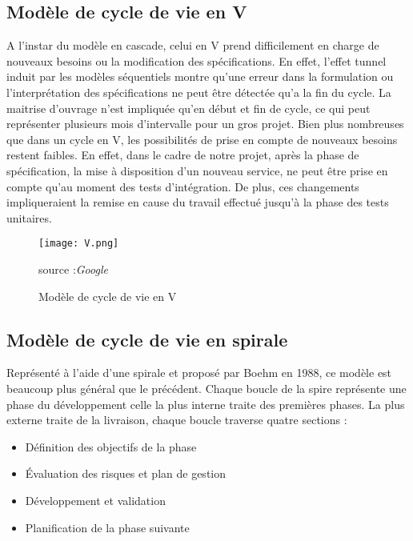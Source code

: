 {{\subsection{Modèle de cycle de vie en V\cite{Ref13}}

A l’instar du modèle en cascade, celui en V prend difficilement en charge de nouveaux besoins ou la modification des spécifications. En effet, l’effet tunnel induit par les modèles séquentiels montre qu’une erreur dans la formulation ou l’interprétation des spécifications ne peut être détectée qu’a la fin du cycle. La maitrise d’ouvrage n’est impliquée qu’en début et fin de cycle, ce qui peut représenter plusieurs mois d’intervalle pour un gros projet. Bien plus nombreuses que dans un cycle en V, les possibilités de prise en compte de nouveaux besoins restent faibles. En effet, dans le cadre de notre projet, après la phase de spécification, la mise à disposition d’un nouveau service, ne peut être prise en compte qu’au moment des tests d’intégration. De plus, ces changements impliqueraient la remise en cause du travail effectué jusqu’à la phase des tests unitaires.

\begin{figure}[H]
	\centering
	\texttt{[image: V.png]}
	\caption{Modèle de cycle de vie en V}{ \begin{center} source :\textit{Google} \end{center}}
	\label{fig:V}
\end{figure}

\subsection{Modèle de cycle de vie en spirale \cite{Ref13}}

Représenté à l’aide d’une spirale et proposé par Boehm en 1988, ce modèle est beaucoup plus général que le précédent. Chaque boucle de la spire représente une phase du développement celle la plus interne traite des premières phases. La plus externe traite de la livraison, chaque boucle traverse quatre sections :

	\begin{itemize}[label=\textbullet, font=\LARGE \color{blue}] 
		
		\item Définition des objectifs de la phase 
		\item Évaluation des risques et plan de gestion
		\item Développement et validation
		\item Planification de la phase suivante
	\end{itemize}
	
}}
